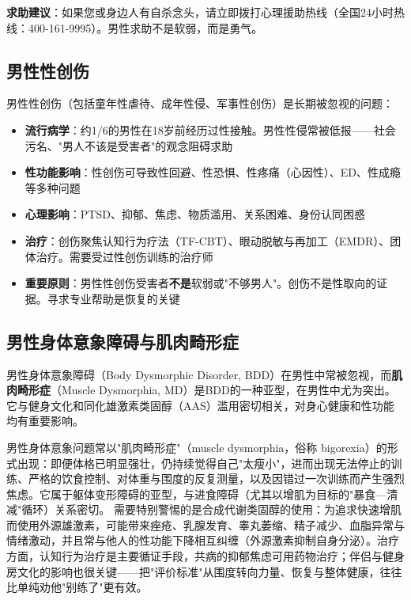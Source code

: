 \textbf{求助建议}：如果您或身边人有自杀念头，请立即拨打心理援助热线（全国24小时热线：400-161-9995）。男性求助不是软弱，而是勇气。

\subsection{男性性创伤}

男性性创伤（包括童年性虐待、成年性侵、军事性创伤）是长期被忽视的问题：

\begin{itemize}[leftmargin=2cm]
	\item \textbf{流行病学}：约1/6的男性在18岁前经历过性接触。男性性侵常被低报——社会污名、"男人不该是受害者"的观念阻碍求助
	\item \textbf{性功能影响}：性创伤可导致性回避、性恐惧、性疼痛（心因性）、ED、性成瘾等多种问题
	\item \textbf{心理影响}：PTSD、抑郁、焦虑、物质滥用、关系困难、身份认同困惑
	\item \textbf{治疗}：创伤聚焦认知行为疗法（TF-CBT）、眼动脱敏与再加工（EMDR）、团体治疗。需要受过性创伤训练的治疗师
	\item \textbf{重要原则}：男性性创伤受害者\textbf{不是}软弱或"不够男人"。创伤不是性取向的证据。寻求专业帮助是恢复的关键
\end{itemize}

\subsection{男性身体意象障碍与肌肉畸形症}
\label{subsec:muscle_dysmorphia}

男性身体意象障碍（Body Dysmorphic Disorder, BDD）在男性中常被忽视，而\textbf{肌肉畸形症}（Muscle Dysmorphia, MD）是BDD的一种亚型，在男性中尤为突出。它与健身文化和同化雄激素类固醇（AAS）滥用密切相关，对身心健康和性功能均有重要影响。


男性身体意象问题常以"肌肉畸形症"（muscle dysmorphia，俗称 bigorexia）的形式出现：即便体格已明显强壮，仍持续觉得自己"太瘦小"，进而出现无法停止的训练、严格的饮食控制、对体重与围度的反复测量，以及因错过一次训练而产生强烈焦虑。它属于躯体变形障碍的亚型，与进食障碍（尤其以增肌为目标的"暴食—清减"循环）关系密切。
需要特别警惕的是合成代谢类固醇的使用：为追求快速增肌而使用外源雄激素，可能带来痤疮、乳腺发育、睾丸萎缩、精子减少、血脂异常与情绪激动，并且常与他人的性功能下降相互纠缠（外源激素抑制自身分泌）。治疗方面，认知行为治疗是主要循证手段，共病的抑郁焦虑可用药物治疗；伴侣与健身房文化的影响也很关键——把"评价标准"从围度转向力量、恢复与整体健康，往往比单纯劝他"别练了"更有效。

